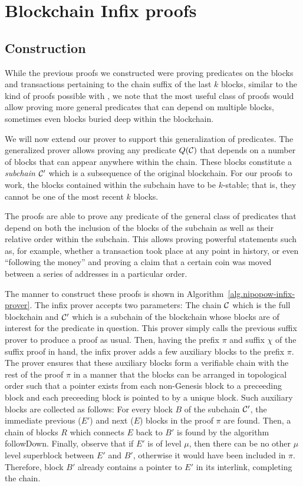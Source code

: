 \section{Blockchain Infix proofs}

\subsection{Construction}

While the previous proofs we constructed were proving predicates on the blocks
and transactions pertaining to the chain suffix of the last $k$ blocks, similar
to the kind of proofs possible with \cite{KLS}, we note that the most useful
class of proofs would allow proving more general predicates that can depend on
multiple blocks, sometimes even blocks buried deep within the blockchain.

We will now extend our prover to support this generalization of predicates. The
generalized prover allows proving any predicate $Q(\mathcal{C})$ that depends on a
number of blocks that can appear anywhere within the chain. These blocks
constitute a \textit{subchain} $\mathcal{C}'$ which is a subsequence of the original
blockchain. For our proofs to work, the blocks contained within the subchain
have to be $k$-stable; that is, they cannot be one of the most recent $k$
blocks.

The proofs are able to prove any predicate of the general class of predicates
that depend on both the inclusion of the blocks of the subchain as well as
their relative order within the subchain. This allows proving powerful
statements such as, for example, whether a transaction took place at any point
in history, or even ``following the money'' and proving a claim that a certain
coin was moved between a series of addresses in a particular order.

The manner to construct these proofs is shown in
Algorithm~\ref{alg.nipopow-infix-prover}. The infix prover accepts two
parameters: The chain $\mathcal{C}$ which is the full blockchain and $\mathcal{C}'$ which
is a subchain of the blockchain whose blocks are of interest for the predicate
in question. This prover simply calls the previous suffix prover to produce a
proof as usual. Then, having the prefix $\pi$ and suffix $\chi$ of the suffix
proof in hand, the infix prover adds a few auxiliary blocks to the prefix
$\pi$. The prover ensures that these auxiliary blocks form a verifiable chain
with the rest of the proof $\pi$ in a manner that the blocks can be arranged in
topological order such that a pointer exists from each non-Genesis block to a
preceeding block and each preceeding block is pointed to by a unique block.
Such auxiliary blocks are collected as follows: For every block $B$ of the
subchain $\mathcal{C}'$, the immediate previous ($E'$) and next ($E$) blocks in the
proof $\pi$ are found. Then, a chain of blocks $R$ which connects $E$ back to
$B'$ is found by the algorithm followDown. Finally, observe that if $E'$ is of
level $\mu$, then there can be no other $\mu$ level superblock between $E'$ and
$B'$, otherwise it would have been included in $\pi$. Therefore, block $B'$
already contains a pointer to $E'$ in its interlink, completing the chain.

